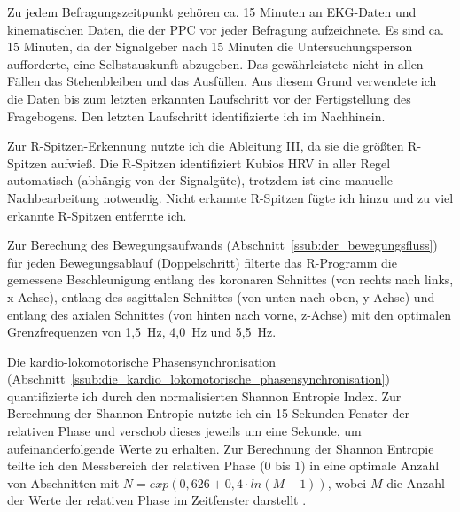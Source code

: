 Zu jedem Befragungszeitpunkt gehören ca. 15 Minuten an \ac{EKG}-Daten und kinematischen Daten, die der \ac{PPC} vor jeder Befragung aufzeichnete. Es sind ca. 15 Minuten, da der Signalgeber nach 15 Minuten die Untersuchungsperson aufforderte, eine Selbstauskunft abzugeben. Das gewährleistete nicht in allen Fällen das Stehenbleiben und das Ausfüllen. Aus diesem Grund verwendete ich die Daten bis zum letzten erkannten Laufschritt vor der Fertigstellung des Fragebogens. Den letzten Laufschritt identifizierte ich im Nachhinein. 

Zur R-Spitzen-Erkennung nutzte ich die Ableitung III, da sie die größten R-Spitzen aufwieß. Die R-Spitzen identifiziert Kubios \ac{HRV} in aller Regel automatisch (abhängig von der Signalgüte), trotzdem ist eine manuelle Nachbearbeitung notwendig. Nicht erkannte R-Spitzen fügte ich hinzu und zu viel erkannte R-Spitzen entfernte ich. 

Zur Berechung des Bewegungsaufwands (Abschnitt~\ref{ssub:der_bewegungsfluss}) für jeden Bewegungsablauf (Doppelschritt) filterte das R-Programm die gemessene Beschleunigung entlang des koronaren Schnittes (von rechts nach links, x-Achse), entlang des sagittalen Schnittes (von unten nach oben, y-Achse) und entlang des axialen Schnittes (von hinten nach vorne, z-Achse) mit den optimalen Grenzfrequenzen von 1,5~Hz, 4,0~Hz und 5,5~Hz.

Die kardio-lokomotorische Phasensynchronisation (Abschnitt~\ref{ssub:die_kardio_lokomotorische_phasensynchronisation}) quantifizierte ich durch den normalisierten Shannon Entropie Index. Zur Berechnung der Shannon Entropie nutzte ich ein 15 Sekunden Fenster der relativen Phase und verschob dieses jeweils um eine Sekunde, um aufeinanderfolgende Werte zu erhalten. Zur Berechnung der Shannon Entropie teilte ich den Messbereich der relativen Phase (0 bis 1) in eine optimale Anzahl von Abschnitten mit $N = exp(0{,}626 + 0{,}4 \cdot ln(M-1))$, wobei $M$ die Anzahl der Werte der relativen Phase im Zeitfenster darstellt \citep[][S.~20]{Rosenblum2003}.

